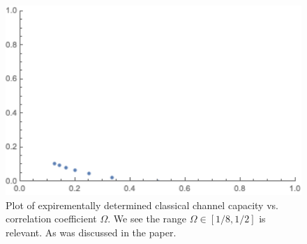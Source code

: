 \documentclass[11pt]{extarticle}	 %
\begin{document}
\begin{flushleft}
\begin{enumerate}
\begin{enumerate}[label=(\Alph*)]
\begin{figure}[h]
\caption{Plot of expirementally determined classical channel capacity vs. correlation coefficient $\Omega$. We see the range $\Omega \in [1/8, 1/2]$ is relevant. As was discussed in the paper.}
\includegraphics[width=400pt]{testedcapacity.png}

\end{figure}





\end{enumerate}


\end{enumerate}
\end{flushleft}
\end{document}
